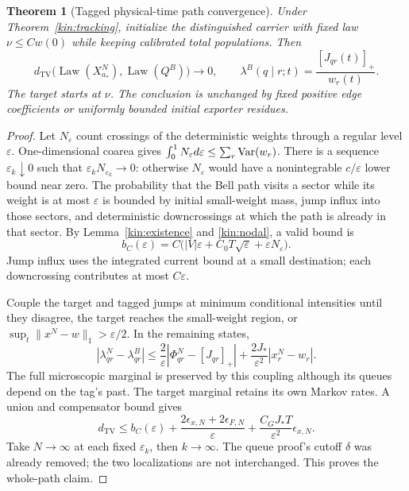 \documentclass[11pt]{article}
\newtheorem{theorem}{Theorem}[section]
\theoremstyle{definition}\newtheorem{definition}[theorem]{Definition}
\theoremstyle{remark}\newtheorem{remark}[theorem]{Remark}
\newcommand{\Law}{\operatorname{Law}}\newcommand{\TV}{d_{\mathrm{TV}}}
\begin{document}
\begin{theorem}[Tagged physical-time path convergence]\label{kin:path}
Under Theorem~\ref{kin:tracking}, initialize the distinguished carrier
with fixed law $\nu\le Cw(0)$ while keeping calibrated total populations.
Then
\begin{equation}
 \TV\bigl(\Law(X_{a_*}^N),\Law(Q^B)\bigr)\longrightarrow0,
 \qquad \lambda^B(q\mid r;t)=\frac{[J_{qr}(t)]_+}{w_r(t)}.
 \label{kin:Belllimit}
\end{equation}
The target starts at $\nu$. The conclusion is unchanged by fixed positive
edge coefficients or uniformly bounded initial exporter residues.
\end{theorem}
\begin{proof}
Let $N_\varepsilon$ count crossings of the deterministic weights through
a regular level $\varepsilon$. One-dimensional coarea gives
$\int_0^1N_\varepsilon d\varepsilon\le\sum_r\operatorname{Var}(w_r)$.
There is a sequence $\varepsilon_k\downarrow0$ such that
$\varepsilon_kN_{\varepsilon_k}\to0$: otherwise $N_\varepsilon$ would
have a nonintegrable $c/\varepsilon$ lower bound near zero.
The probability that the Bell path visits a sector while its weight is
at most $\varepsilon$ is bounded by initial small-weight mass, jump
influx into those sectors, and deterministic downcrossings at which the
path is already in that sector. By Lemma~\ref{kin:existence} and
\eqref{kin:nodal}, a valid bound is
\begin{equation}
 b_C(\varepsilon)=C\bigl(|V|\varepsilon+
 C_0T\sqrt\varepsilon+\varepsilon N_\varepsilon\bigr).
 \label{kin:nodebudget}
\end{equation}
Jump influx uses the integrated current bound at a small destination;
each downcrossing contributes at most $C\varepsilon$.

Couple the target and tagged jumps at minimum conditional intensities
until they disagree, the target reaches the small-weight region, or
$\sup_t\|x^N-w\|_1>\varepsilon/2$. In the remaining states,
\[
 |\lambda^N_{qr}-\lambda^B_{qr}|
 \le\frac2\varepsilon|\Phi^N_{qr}-[J_{qr}]_+|
 +\frac{2J_*}{\varepsilon^2}|x_r^N-w_r|.
\]
The full microscopic marginal is preserved by this coupling although its
queues depend on the tag's past. The target marginal retains its own
Markov rates. A union and compensator bound gives
\begin{equation}
 \TV\le b_C(\varepsilon)
 +\frac{2\epsilon_{x,N}+2\epsilon_{F,N}}{\varepsilon}
 +\frac{C_GJ_*T}{\varepsilon^2}\epsilon_{x,N}.
 \label{kin:pathbound}
\end{equation}
Take $N\to\infty$ at each fixed $\varepsilon_k$, then $k\to\infty$.
The queue proof's cutoff $\delta$ was already removed; the two
localizations are not interchanged. This proves the whole-path claim.
\end{proof}
\end{document}
